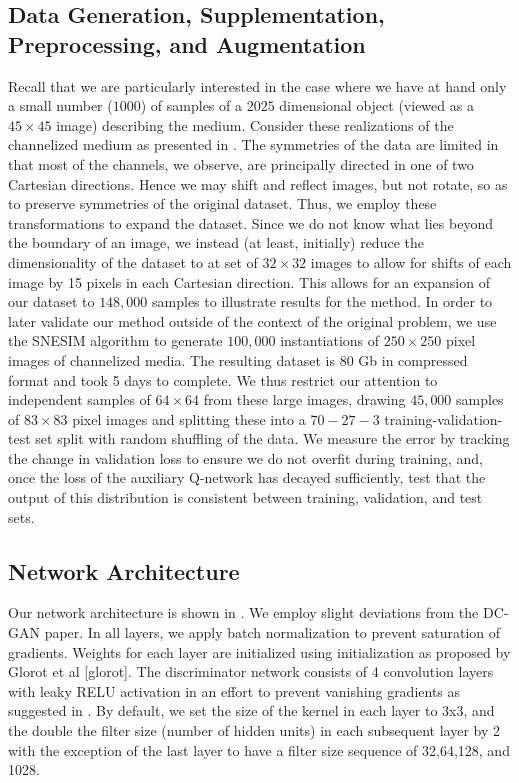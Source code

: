 \documentclass{article}
\begin{document}
\subsection{Data Generation, Supplementation, Preprocessing, and Augmentation}\label{aug}
	Recall that we are particularly interested in the case where we have at hand only a small number ($1000$) of samples of a $2025$ dimensional object (viewed as a $45\times45$ image) describing the medium.  Consider these realizations of the channelized medium as presented in \label{intokpca}.  The symmetries of the data are limited in that most of the channels, we observe, are principally directed in one of two Cartesian directions.  Hence we may shift and reflect images, but not rotate, so as to preserve symmetries of the original dataset.  Thus, we employ these transformations to expand the dataset.  Since we do not know what lies beyond the boundary of an image, we instead (at least, initially) reduce the dimensionality of the dataset to at set of $32\times 32$ images to allow for shifts of each image by 15 pixels in each Cartesian direction.  This allows for an expansion of our dataset to $148,000$ samples to illustrate results for the method.  In order to later validate our method outside of the context of the original problem, we use the SNESIM algorithm to generate $100,000$ instantiations of $250\times 250$ pixel images of channelized media.  The resulting dataset is 80 Gb in compressed format and took 5 days to complete. We thus restrict our attention to independent samples of $64 \times 64 $ from these large images, drawing $45,000$ samples of $83\times 83$ pixel images and splitting these into a $70-27-3$ training-validation-test set split with random shuffling of the data.  We measure the error by tracking the change in validation loss to ensure we do not overfit during training, and, once the loss of the auxiliary Q-network has decayed sufficiently, test that the output of this distribution is consistent between training, validation, and test sets. 

\subsection{Network Architecture}\label{arch}
Our network architecture is shown in \label{nnet}.  We employ slight deviations from the DC-GAN paper.  In all layers, we apply batch normalization to prevent saturation of gradients. Weights for each layer are initialized using initialization as proposed by Glorot et al [glorot]. The discriminator network consists of 4 convolution layers with leaky RELU activation in an effort to prevent vanishing gradients as suggested in \cite{Radford2015UnsupervisedNetworks}. By default, we set the size of the kernel in each layer to 3x3, and the double the filter size (number of hidden units) in each subsequent layer by 2 with the exception of the last layer to have a filter size sequence of 32,64,128, and 1028.
\end{document}
